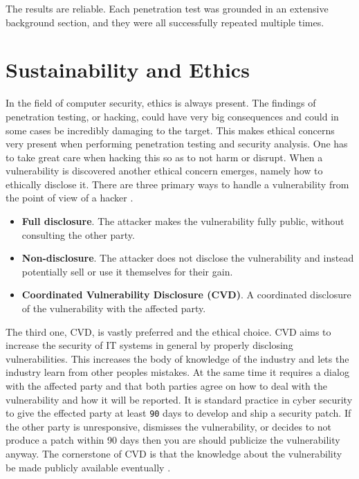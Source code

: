 The results are reliable. Each penetration test was grounded in an extensive background section, and they were all successfully repeated multiple times.

\section{Sustainability and Ethics}
In the field of computer security, ethics is always present. The findings of penetration testing, or hacking, could have very big consequences and could in some cases be incredibly damaging to the target. This makes ethical concerns very present when performing penetration testing and security analysis. One has to take great care when hacking this so as to not harm or disrupt. When a vulnerability is discovered another ethical concern emerges, namely how to ethically disclose it. There are three primary ways to handle a vulnerability from the point of view of a hacker \cite{disclosure-guideline}.
\begin{itemize}
    \item \textbf{Full disclosure}. The attacker makes the vulnerability fully public, without consulting the other party.
    \item \textbf{Non-disclosure}. The attacker does not disclose the vulnerability and instead potentially sell or use it themselves for their gain.
    \item \textbf{Coordinated Vulnerability Disclosure (CVD)}. A coordinated disclosure of the vulnerability with the affected party.
\end{itemize}
The third one, CVD, is vastly preferred and the ethical choice. CVD aims to increase the security of IT systems in general by properly disclosing vulnerabilities. This increases the body of knowledge of the industry and lets the industry learn from other peoples mistakes. At the same time it requires a dialog with the affected party and that both parties agree on how to deal with the vulnerability and how it will be reported. It is standard practice in cyber security to give the effected party at least \texttt{90} days to develop and ship a security patch. If the other party is unresponsive, dismisses the vulnerability, or decides to not produce a patch within 90 days then you are should publicize the vulnerability anyway. The cornerstone of CVD is that the knowledge about the vulnerability be made publicly available eventually \cite{disclosure-guideline}.

